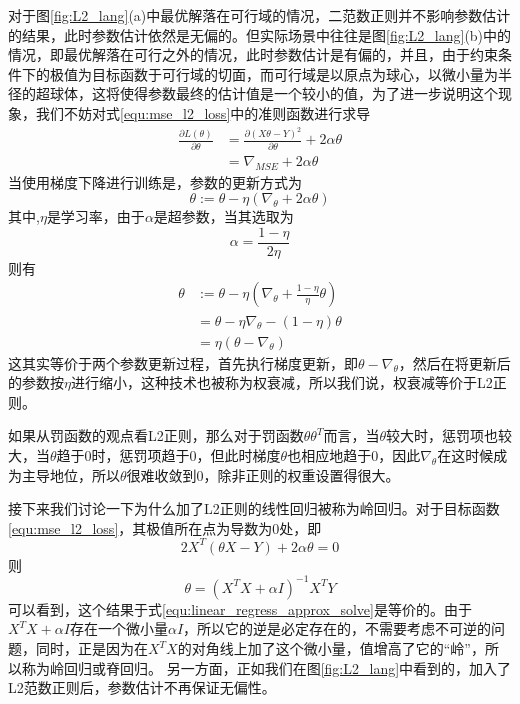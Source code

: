 对于图\ref{fig:L2_lang}(a)中最优解落在可行域的情况，二范数正则并不影响参数估计的结果，此时参数估计依然是无偏的。但实际场景中往往是图\ref{fig:L2_lang}(b)中的情况，即最优解落在可行之外的情况，此时参数估计是有偏的，并且，由于约束条件下的极值为目标函数于可行域的切面，而可行域是以原点为球心，以微小量为半径的超球体，这将使得参数最终的估计值是一个较小的值，为了进一步说明这个现象，我们不妨对式\ref{equ:mse_l2_loss}中的准则函数进行求导
\begin{equation}
\begin{split}
	\frac{\partial L(\theta)}{\partial \theta} &= \frac{\partial(X\theta  - Y)^2}{\partial \theta} + 2\alpha \theta\\
	&= \nabla_{MSE} + 2\alpha \theta
\end{split}
\end{equation}
当使用梯度下降进行训练是，参数的更新方式为
\begin{equation}
	\theta := \theta -\eta (\nabla_{\theta} + 2\alpha \theta)
\end{equation}
其中,$\eta$是学习率，由于$\alpha$是超参数，当其选取为
\begin{equation}
	\alpha = \frac{1 - \eta}{2\eta}
\end{equation}
则有
\begin{equation}
\begin{split}
	\theta &:= \theta -\eta (\nabla_{\theta} + \frac{1-\eta}{\eta} \theta)\\
	&= \theta - \eta\nabla_{\theta} - (1-\eta)\theta\\
	&=\eta(\theta - \nabla_{\theta})
 \end{split}
\end{equation}
这其实等价于两个参数更新过程，首先执行梯度更新，即$\theta - \nabla_{\theta}$，然后在将更新后的参数按$\eta$进行缩小，这种技术也被称为权衰减，所以我们说，权衰减等价于L2正则。

如果从罚函数的观点看L2正则，那么对于罚函数$\theta\theta^T$而言，当$\theta$较大时，惩罚项也较大，当$\theta$趋于0时，惩罚项趋于0，但此时梯度$\theta$也相应地趋于0，因此$\nabla_{\theta}$在这时候成为主导地位，所以$\theta$很难收敛到0，除非正则的权重设置得很大。

接下来我们讨论一下为什么加了L2正则的线性回归被称为岭回归。对于目标函数\ref{equ:mse_l2_loss}，其极值所在点为导数为0处，即
\begin{equation}
	2X^T(\theta X - Y) + 2\alpha\theta = 0
\end{equation}
则
\begin{equation}
	\theta = (X^TX + \alpha I)^{-1}X^TY
\end{equation}
可以看到，这个结果于式\ref{equ:linear_regress_approx_solve}是等价的。由于$X^TX + \alpha I$存在一个微小量$\alpha I$，所以它的逆是必定存在的，不需要考虑不可逆的问题，同时，正是因为在$X^TX$的对角线上加了这个微小量，值增高了它的“岭”，所以称为岭回归或脊回归。 另一方面，正如我们在图\ref{fig:L2_lang}中看到的，加入了L2范数正则后，参数估计不再保证无偏性。

